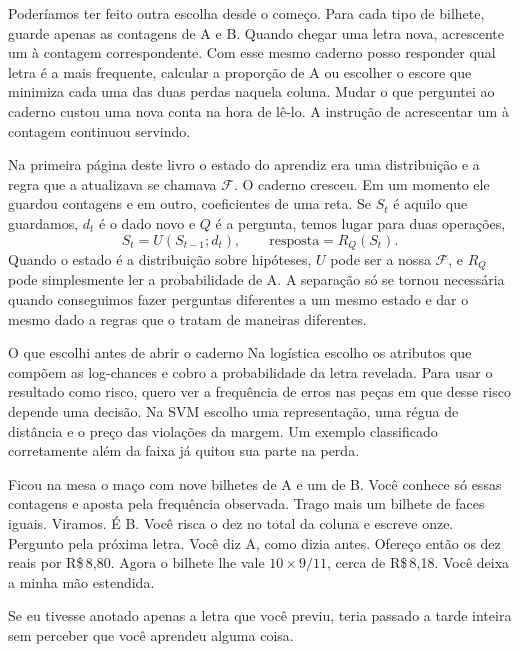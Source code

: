 Poderíamos ter feito outra escolha desde o começo. Para cada tipo de bilhete, guarde apenas as contagens de A e B. Quando chegar uma letra nova, acrescente um à contagem correspondente. Com esse mesmo caderno posso responder qual letra é a mais frequente, calcular a proporção de A ou escolher o escore que minimiza cada uma das duas perdas naquela coluna. Mudar o que perguntei ao caderno custou uma nova conta na hora de lê-lo. A instrução de acrescentar um à contagem continuou servindo.

Na primeira página deste livro o estado do aprendiz era uma distribuição e a regra que a atualizava se chamava $\mathcal F$. O caderno cresceu. Em um momento ele guardou contagens e em outro, coeficientes de uma reta. Se $S_t$ é aquilo que guardamos, $d_t$ é o dado novo e $Q$ é a pergunta, temos lugar para duas operações,
\[
        S_t=U(S_{t-1};d_t),\qquad
        \text{resposta}=R_Q(S_t).
\]
Quando o estado é a distribuição sobre hipóteses, $U$ pode ser a nossa $\mathcal F$, e $R_Q$ pode simplesmente ler a probabilidade de A. A separação só se tornou necessária quando conseguimos fazer perguntas diferentes a um mesmo estado e dar o mesmo dado a regras que o tratam de maneiras diferentes.

\begin{quadro}{O que escolhi antes de abrir o caderno}
 Na logística escolho os atributos que compõem as log-chances e cobro a probabilidade da letra revelada. Para usar o resultado como risco, quero ver a frequência de erros nas peças em que desse risco depende uma decisão.
 Na SVM escolho uma representação, uma régua de distância e o preço das violações da margem. Um exemplo classificado corretamente além da faixa já quitou sua parte na perda.
\end{quadro}

Ficou na mesa o maço com nove bilhetes de A e um de B. Você conhece só essas contagens e aposta pela frequência observada. Trago mais um bilhete de faces iguais. Viramos. É B. Você risca o dez no total da coluna e escreve onze. Pergunto pela próxima letra. Você diz A, como dizia antes. Ofereço então os dez reais por R\$\,8,80. Agora o bilhete lhe vale $10\times9/11$, cerca de R\$\,8,18. Você deixa a minha mão estendida.

Se eu tivesse anotado apenas a letra que você previu, teria passado a tarde inteira sem perceber que você aprendeu alguma coisa.

